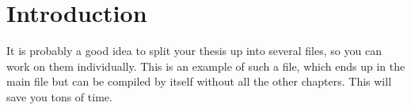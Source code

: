 \documentclass[../thesis.tex]{subfiles}
\begin{document}
\chapter{Introduction}
\label{chap:Introduction}

It is probably a  good idea to split your thesis up  into several files, so
you can  work on  them individually.  This  is an example  of such  a file,
which ends up  in the main file  but can be compiled by  itself without all
the other chapters.  This will save you tons of time.
\end{document}
